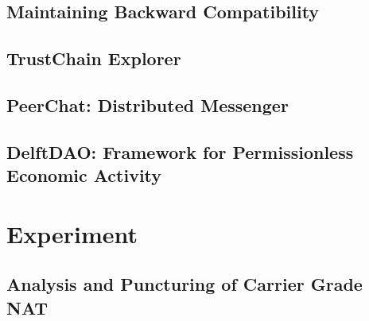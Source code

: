 


\section{Maintaining Backward Compatibility}

\section{TrustChain Explorer}


\section{PeerChat: Distributed Messenger}


\section{DelftDAO: Framework for Permissionless Economic Activity}

\chapter{Experiment}

\section{Analysis and Puncturing of Carrier Grade NAT}

